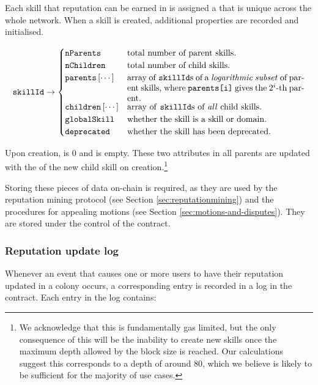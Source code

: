Each skill that reputation can be earned in is assigned a  that is unique across the whole network. When a skill is created, additional properties are recorded and initialised.

\begin{equation*}
  \ascode{skillId} \rightarrow
  \begin{cases}
    \ascode{nParents} &	\textnormal{total number of parent skills.}\\
    \ascode{nChildren} &	\textnormal{total number of child skills.}\\
    \ascode{parents}\left[\cdots\right] &	\parbox[t]{.6\linewidth}{\textnormal{array of \ascode{skillId}s of a \textit{logarithmic subset} of parent skills, where \ascode{parents[i]} gives the $2^i$-th parent.}}\\
    \ascode{children}\left[\cdots\right] &	\textnormal{array of \ascode{skillId}s of \textit{all} child skills.}\\
    \ascode{globalSkill} &	\textnormal{whether the skill is a skill or domain.}\\
    \ascode{deprecated} &	\textnormal{whether the skill has been deprecated.}
  \end{cases}
\end{equation*}

Upon creation,  is 0 and  is empty. These two attributes in all parents are updated with the  of the new child skill on creation.\footnote{We acknowledge that this is fundamentally gas limited, but the only consequence of this will be the inability to create new skills once the maximum depth allowed by the block size is reached. Our calculations suggest this corresponds to a depth of around 80, which we believe  is likely to be sufficient for the majority of use cases.}

Storing these pieces of data on-chain is required, as they are used by the reputation mining protocol (see Section \ref{sec:reputationmining}) and the procedures for appealing motions (see Section \ref{sec:motions-and-disputes}). They are stored under the control of the  contract.

\subsubsection{Reputation update log}\label{subsec:reputation-update-log}

Whenever an event that causes one or more users to have their reputation updated in a colony occurs, a corresponding entry is recorded in a log in the  contract. Each entry in the log contains:

